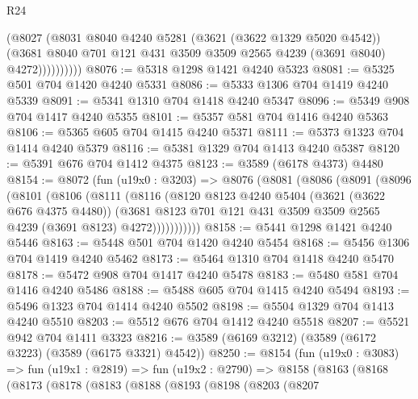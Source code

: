 \begin{lexlean}{R24}
\begin{coremodule}
                  (@8027
                    (@8031
                      @8040
                      @4240
                      @5281
                      (@3621 (@3622 @1329 @5020 @4542))
                      (@3681
                        @8040
                        @701
                        @121
                        @431
                        @3509
                        @3509
                        @2565
                        @4239
                        (@3691 @8040)
                        @4272))))))))))
@8076 := @5318 @1298 @1421 @4240 @5323
@8081 := @5325 @501 @704 @1420 @4240 @5331
@8086 := @5333 @1306 @704 @1419 @4240 @5339
@8091 := @5341 @1310 @704 @1418 @4240 @5347
@8096 := @5349 @908 @704 @1417 @4240 @5355
@8101 := @5357 @581 @704 @1416 @4240 @5363
@8106 := @5365 @605 @704 @1415 @4240 @5371
@8111 := @5373 @1323 @704 @1414 @4240 @5379
@8116 := @5381 @1329 @704 @1413 @4240 @5387
@8120 := @5391 @676 @704 @1412 @4375
@8123 := @3589 (@6178 @4373) @4480
@8154 := @8072
    (fun (u19x0 : @3203) =>
    @8076
      (@8081
        (@8086
          (@8091
            (@8096
              (@8101
                (@8106
                  (@8111
                    (@8116
                      (@8120
                        @8123
                        @4240
                        @5404
                        (@3621 (@3622 @676 @4375 @4480))
                        (@3681
                          @8123
                          @701
                          @121
                          @431
                          @3509
                          @3509
                          @2565
                          @4239
                          (@3691 @8123)
                          @4272)))))))))))
@8158 := @5441 @1298 @1421 @4240 @5446
@8163 := @5448 @501 @704 @1420 @4240 @5454
@8168 := @5456 @1306 @704 @1419 @4240 @5462
@8173 := @5464 @1310 @704 @1418 @4240 @5470
@8178 := @5472 @908 @704 @1417 @4240 @5478
@8183 := @5480 @581 @704 @1416 @4240 @5486
@8188 := @5488 @605 @704 @1415 @4240 @5494
@8193 := @5496 @1323 @704 @1414 @4240 @5502
@8198 := @5504 @1329 @704 @1413 @4240 @5510
@8203 := @5512 @676 @704 @1412 @4240 @5518
@8207 := @5521 @942 @704 @1411 @3323
@8216 := @3589 (@6169 @3212) (@3589 (@6172 @3223) (@3589 (@6175 @3321) @4542))
@8250 := @8154
    (fun (u19x0 : @3083) =>
    fun (u19x1 : @2819) =>
    fun (u19x2 : @2790) =>
    @8158
      (@8163
        (@8168
          (@8173
            (@8178
              (@8183
                (@8188
                  (@8193
                    (@8198
                      (@8203
                        (@8207

\end{coremodule}
\end{lexlean}
